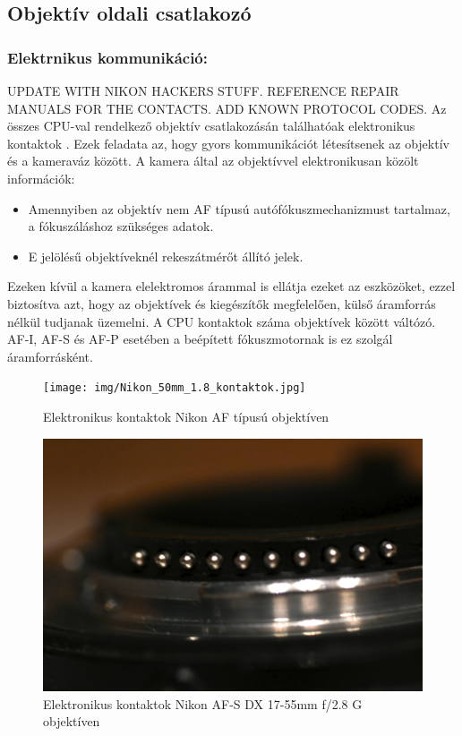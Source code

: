 \subsection{Objektív oldali csatlakozó}

\subsubsection{Elektrnikus kommunikáció:}
UPDATE WITH NIKON HACKERS STUFF. REFERENCE REPAIR MANUALS FOR THE CONTACTS. ADD KNOWN PROTOCOL CODES.
Az összes CPU-val rendelkező objektív csatlakozásán találhatóak elektronikus kontaktok \cite{Nikon_CPU}. Ezek feladata az, hogy gyors kommunikációt létesítsenek az objektív és a kameraváz között.
A kamera által az objektívvel elektronikusan közölt információk:
\begin{itemize}
    \item Amennyiben az objektív nem AF típusú autófókuszmechanizmust tartalmaz, a fókuszáláshoz szükséges adatok.
    \item E jelölésű objektíveknél rekeszátmérőt állító jelek.
\end{itemize}
Ezeken kívül a kamera elelektromos árammal is ellátja ezeket az eszközöket, ezzel biztosítva azt, hogy az objektívek és kiegészítők megfelelően, külső áramforrás nélkül tudjanak üzemelni. A CPU kontaktok száma objektívek között váltózó.\cite{Nikon_CPU} AF-I, AF-S és AF-P esetében a beépített fókuszmotornak is ez szolgál áramforrásként.

\begin{figure}[H]
	\centering
	\texttt{[image: img/Nikon\_50mm\_1.8\_kontaktok.jpg]}
	\caption{Elektronikus kontaktok Nikon AF típusú objektíven}
	\label{fig:AF_kontakt}
\end{figure}

\begin{figure}[H]
	\centering
	\includegraphics[width=0.5\linewidth]{img/Nikon_17-55_kontaktok.jpg}
	\caption{Elektronikus kontaktok Nikon AF-S DX 17-55mm f/2.8 G objektíven}
	\label{fig:G_kontakt}
\end{figure}


